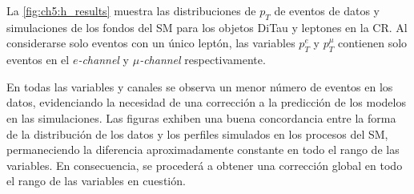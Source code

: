 
La \cref{fig:ch5:h_results} muestra las distribuciones de $p_T$ de eventos de datos y simulaciones de los fondos del SM para los objetos DiTau y leptones en la CR. Al considerarse solo eventos con un único leptón, las variables $p_T^{e}$ y $p_T^{\mu}$ contienen solo eventos en el \textit{$e$-channel} y \textit{$\mu$-channel} respectivamente. 

En todas las variables y canales se observa un menor número de eventos en los datos, evidenciando la necesidad de una corrección a la predicción de los modelos en las simulaciones. Las figuras exhiben una buena concordancia entre la forma de la distribución de los datos y los perfiles simulados en los procesos del SM, permaneciendo la diferencia aproximadamente constante en todo el rango de las variables. En consecuencia, se procederá a obtener una corrección global en todo el rango de las variables en cuestión.


